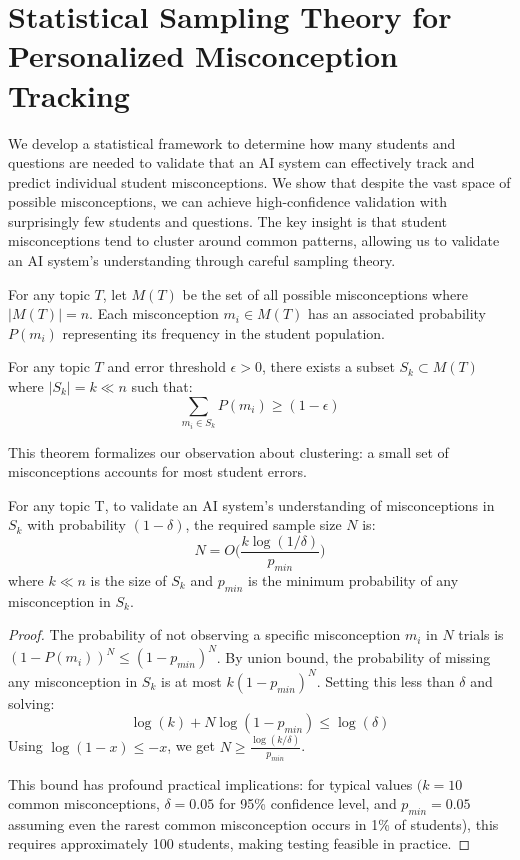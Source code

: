 \section{Statistical Sampling Theory for Personalized Misconception Tracking}
We develop a statistical framework to determine how many students and questions are needed to validate that an AI system can effectively track and predict individual student misconceptions. We show that despite the vast space of possible misconceptions, we can achieve high-confidence validation with surprisingly few students and questions. The key insight is that student misconceptions tend to cluster around common patterns, allowing us to validate an AI system's understanding through careful sampling theory.

\begin{definition}
For any topic $T$, let $M(T)$ be the set of all possible misconceptions where $|M(T)| = n$. Each misconception $m_i \in M(T)$ has an associated probability $P(m_i)$ representing its frequency in the student population.
\end{definition}

\begin{theorem}
For any topic $T$ and error threshold $\epsilon > 0$, there exists a subset $S_k \subset M(T)$ where $|S_k| = k \ll n$ such that:
\[\sum_{m_i \in S_k} P(m_i) \geq (1-\epsilon)\]

This theorem formalizes our observation about clustering: a small set of misconceptions accounts for most student errors.
\end{theorem}

\begin{theorem}
\label{theorem:sample_complexity}
For any topic T, to validate an AI system's understanding of misconceptions in $S_k$ with probability $(1-\delta)$, the required sample size $N$ is:
\[N = O\Bigg(\frac{k \log(1/\delta)}{p_{min}}\Bigg)\]
where $k \ll n$ is the size of $S_k$ and $p_{min}$ is the minimum probability of any misconception in $S_k$.
\end{theorem}

\begin{proof}
The probability of not observing a specific misconception $m_i$ in $N$ trials is $(1-P(m_i))^N \leq (1-p_{min})^N$. By union bound, the probability of missing any misconception in $S_k$ is at most $k(1-p_{min})^N$. Setting this less than $\delta$ and solving:
\[\log(k) + N\log(1-p_{min}) \leq \log(\delta)\]
Using $\log(1-x) \leq -x$, we get $N \geq \frac{\log(k/\delta)}{p_{min}}$.

This bound has profound practical implications: for typical values $(k = 10$ common misconceptions, $\delta = 0.05$ for 95\% confidence level, and $p_{min} = 0.05$ assuming even the rarest common misconception occurs in 1\% of students), this requires approximately 100 students, making testing feasible in practice.

\end{proof}

